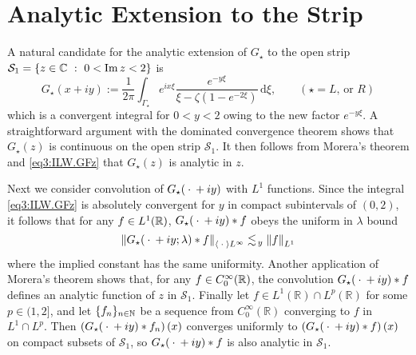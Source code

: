 \documentclass[../dissertation.tex]{subfiles}
\begin{document}
\section{Analytic Extension to the Strip}\label{sec3:Analyticity}

A natural candidate for the analytic extension of $G_\star$ to the open strip 
$\mathcal S_1 = \{ z \in \mathbb C ~:~ 0 < \operatorname{Im} z < 2\}$ is
\begin{equation}
	\label{eq3:ILW.GFz}
	G_\star(x+iy) 
		:= \frac{1}{2\pi} 
			\int_{\Gamma_\star} e^{ix\xi} 
				\frac{e^{-y\xi}}{\xi - \zeta\left(1-e^{-2\xi}\right)} 
			\, \mathrm{d}\xi,
		\qquad (\star = L \text{, or } R)
\end{equation}
which is a convergent integral for $0<y<2$ owing to the new factor $e^{-y\xi}$. 
A straightforward argument with the dominated convergence theorem shows that 
$G_\star(z)$ is continuous on the open strip $\mathcal S_1$. It then follows from 
Morera's theorem and \eqref{eq3:ILW.GFz} that $G_\star(z)$ is analytic in $z$.

Next we consider convolution of $G_\star(\kern 0.5ex \cdot \kern 0.5ex+iy)$ with $L^1$ functions. Since the integral 
\eqref{eq3:ILW.GFz} is absolutely convergent for $y$ in compact subintervals of $(0,2)$, it 
follows that for any $f \in L^1(\mathbb{R})$, $G_\star(\kern 0.5ex \cdot \kern 0.5ex+iy)* f$  obeys the uniform
in $\lambda$ bound 
\[
	\left\|G_\star(\kern 0.5ex \cdot \kern 0.5ex+iy; \lambda)* f\right\|_{\left\langle \kern 0.5ex \cdot \kern 0.5ex \right\rangle L^\infty} 
		\lesssim_{\, y} \left\|f\right\|_{L^1}
\] 
where the implied constant has the same uniformity. Another application of Morera's 
theorem shows that, for any $f \in C_0^\infty(\mathbb{R})$, the convolution $G_\star(\kern 0.5ex \cdot \kern 0.5ex+iy)*f$ 
defines an analytic function of $z$ in $\mathcal S_1$. Finally let 
$f \in L^1(\mathbb R) \cap L^p(\mathbb R)$ for some 
$p \in (1,2]$, and let $\{ f_n \}_{n \in \mathbb{N}}$ be a sequence from $C_0^\infty(\mathbb R)$ 
converging to $f$ in $L^1 \cap L^p$. Then $\left(G_\star(\kern 0.5ex \cdot \kern 0.5ex+iy)*f_n\right)(x)$ converges 
uniformly to $\left(G_\star(\kern 0.5ex \cdot \kern 0.5ex+iy)*f\right)(x)$ on compact subsets of $\mathcal S_1$, 
so $G_\star(\kern 0.5ex \cdot \kern 0.5ex+iy)*f$ is also analytic in $\mathcal S_1$. 
\end{document}
